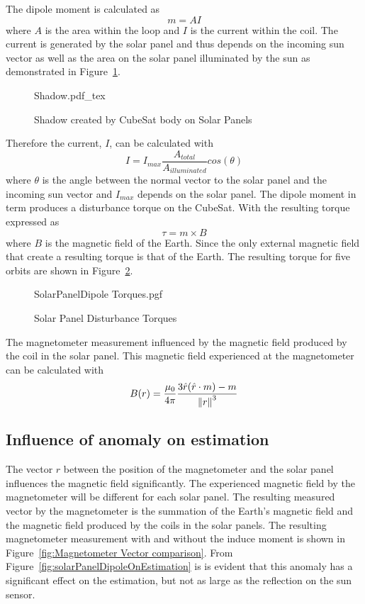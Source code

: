 The dipole moment is calculated as
\begin{equation}
m = AI
\end{equation}
where $A$ is the area within the loop and $I$ is the current within the coil. The current is generated by the solar panel and thus depends on the incoming sun vector as well as the area on the solar panel illuminated by the sun as demonstrated in Figure~\ref{fig:Shadow}. 
\begin{figure}[!hbt]
	\centering
	\def\svgwidth{14cm}
	{Shadow.pdf_tex}
	\caption{Shadow created by CubeSat body on Solar Panels}
	\label{fig:Shadow}
\end{figure}
Therefore the current, $I$, can be calculated with
\begin{equation}
I = I_{max}\frac{A_{total}}{A_{illuminated}}cos(\theta)
\end{equation}
where $\theta$ is the angle between the normal vector to the solar panel and the incoming sun vector and $I_{max}$ depends on the solar panel. The dipole moment in term produces a disturbance torque on the CubeSat. With the resulting torque expressed as
\begin{equation}
\tau = m \times B
\end{equation}
where $B$ is the magnetic field of the Earth. Since the only external magnetic field that create a resulting torque is that of the Earth. The resulting torque for five orbits are shown in Figure~\ref{fig:solarPanel Disturbance Torques}.
\begin{figure}[!htb]
	\centering
	
	{SolarPanelDipole Torques.pgf}
	
	\caption{Solar Panel Disturbance Torques}
	\label{fig:solarPanel Disturbance Torques}
\end{figure}

The magnetometer measurement influenced by the magnetic field produced by the coil in the solar panel. This magnetic field experienced at the magnetometer can be calculated with 
\begin{equation}
B(r) = \frac{\mu_0}{4\pi} \frac{3 \hat{r} (\hat{r} \cdot m) - m}{\left\lVert r\right\rVert^3}
\end{equation}

\subsection{Influence of anomaly on estimation}
The vector $r$ between the position of the magnetometer and the solar panel influences the magnetic field significantly. The experienced magnetic field  by the magnetometer will be different for each solar panel. The resulting measured vector by the magnetometer is the summation of the Earth's magnetic field and the magnetic field produced by the coils in the solar panels. The resulting magnetometer measurement with and without the induce moment is shown in Figure~\ref{fig:Magnetometer Vector comparison}. From Figure~\ref{fig:solarPanelDipoleOnEstimation} is is evident that this anomaly has a significant effect on the estimation, but not as large as the reflection on the sun sensor. 

